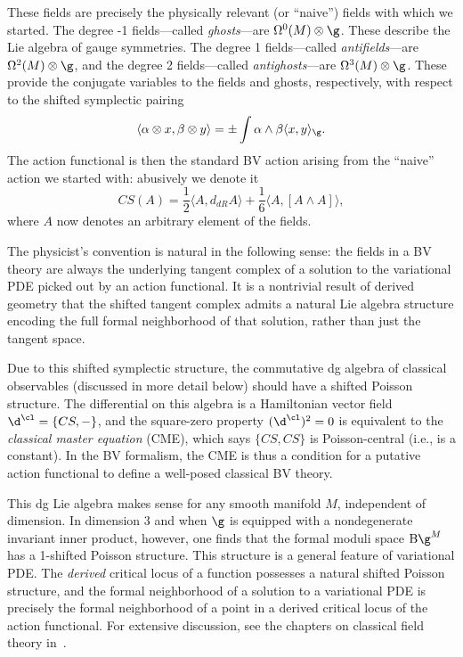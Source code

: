 \documentclass[10pt]{amsart}
\begin{document}
These fields are precisely the physically relevant (or ``naive'') fields with which we started.
The degree -1 fields---called {\em ghosts}---are $\Omega^0(M) \otimes \g$.
These describe the Lie algebra of gauge symmetries.
The degree 1 fields---called {\em antifields}---are $\Omega^2(M) \otimes \g$,
and the degree 2 fields---called {\em antighosts}---are $\Omega^3(M) \otimes \g$.
These provide the conjugate variables to the fields and ghosts, respectively,
with respect to the shifted symplectic pairing 
\[
\langle \alpha \otimes x, \beta \otimes y \rangle = \pm \int \alpha \wedge \beta \langle x,y\rangle_\g.
\]
The action functional is then the standard BV action arising from the ``naive'' action we started with:
abusively we denote it
\[
CS(A) = \frac{1}{2} \langle A, d_{dR} A \rangle + \frac{1}{6} \langle A, [A \wedge A] \rangle,
\] 
where $A$ now denotes an arbitrary element of the fields.

\begin{rmk}
The physicist's convention is natural in the following sense:
the fields in a BV theory are always the underlying tangent complex of a solution to the variational PDE picked out by an action functional.
It is a nontrivial result of derived geometry that the shifted tangent complex admits a natural Lie algebra structure encoding the full formal neighborhood of that solution, rather than just the tangent space.
\end{rmk}

Due to this shifted symplectic structure, the commutative dg algebra of classical observables 
(discussed in more detail below) should have a shifted Poisson structure.
The differential on this algebra is a Hamiltonian vector field $\d^\cl = \{CS,-\}$,
and the square-zero property $(\d^\cl)^2 = 0$ is equivalent to the {\em classical master equation} (CME),
which says $\{CS,CS\}$ is Poisson-central (i.e., is a constant).
In the BV formalism, the CME is thus a condition for a putative action functional to define a well-posed classical BV theory.

\begin{rmk}
This dg Lie algebra makes sense for any smooth manifold $M$, independent of dimension.
In dimension 3 and when $\g$ is equipped with a nondegenerate invariant inner product, however, one finds that the formal moduli space ${\rm B}\g^M$ has a 1-shifted Poisson structure.
This structure is a general feature of variational PDE.
The {\em derived} critical locus of a function possesses a natural shifted Poisson structure,
and the formal neighborhood of a solution to a variational PDE is precisely the formal neighborhood of a point in a derived critical locus of the action functional.
For extensive discussion, see the chapters on classical field theory in~\cite{CG2}.
\end{rmk}
\end{document}
